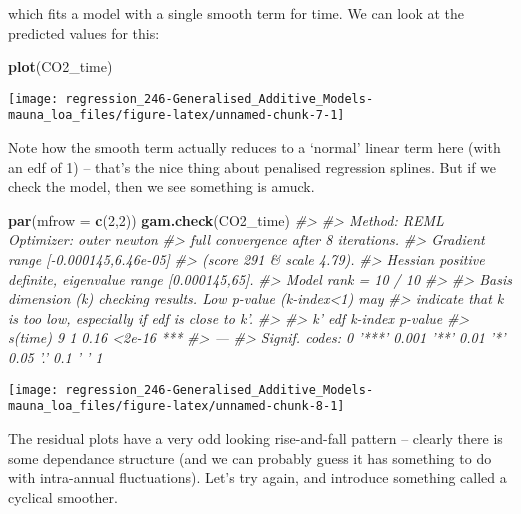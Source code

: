 \documentclass[]{book}
\newenvironment{Shaded}{\begin{snugshade}}{\end{snugshade}}
\newcommand{\CommentTok}[1]{\textcolor[rgb]{0.56,0.35,0.01}{\textit{#1}}}
\newcommand{\DataTypeTok}[1]{\textcolor[rgb]{0.13,0.29,0.53}{#1}}
\newcommand{\DecValTok}[1]{\textcolor[rgb]{0.00,0.00,0.81}{#1}}
\newcommand{\KeywordTok}[1]{\textcolor[rgb]{0.13,0.29,0.53}{\textbf{#1}}}
\newcommand{\NormalTok}[1]{#1}
\begin{document}
which fits a model with a single smooth term for time. We can look at the predicted values for this:

\begin{Shaded}
\begin{Highlighting}[]
\KeywordTok{plot}\NormalTok{(CO2_time)}
\end{Highlighting}
\end{Shaded}

\begin{center}\texttt{[image: regression\_246-Generalised\_Additive\_Models-mauna\_loa\_files/figure-latex/unnamed-chunk-7-1]} \end{center}

Note how the smooth term actually reduces to a `normal' linear term here (with an edf of 1) -- that's the nice thing about penalised regression splines. But if we check the model, then we see something is amuck.

\begin{Shaded}
\begin{Highlighting}[]
\KeywordTok{par}\NormalTok{(}\DataTypeTok{mfrow =} \KeywordTok{c}\NormalTok{(}\DecValTok{2}\NormalTok{,}\DecValTok{2}\NormalTok{))}
\KeywordTok{gam.check}\NormalTok{(CO2_time)}
\CommentTok{#> }
\CommentTok{#> Method: REML   Optimizer: outer newton}
\CommentTok{#> full convergence after 8 iterations.}
\CommentTok{#> Gradient range [-0.000145,6.46e-05]}
\CommentTok{#> (score 291 & scale 4.79).}
\CommentTok{#> Hessian positive definite, eigenvalue range [0.000145,65].}
\CommentTok{#> Model rank =  10 / 10 }
\CommentTok{#> }
\CommentTok{#> Basis dimension (k) checking results. Low p-value (k-index<1) may}
\CommentTok{#> indicate that k is too low, especially if edf is close to k'.}
\CommentTok{#> }
\CommentTok{#>         k' edf k-index p-value    }
\CommentTok{#> s(time)  9   1    0.16  <2e-16 ***}
\CommentTok{#> ---}
\CommentTok{#> Signif. codes:  0 '***' 0.001 '**' 0.01 '*' 0.05 '.' 0.1 ' ' 1}
\end{Highlighting}
\end{Shaded}

\begin{center}\texttt{[image: regression\_246-Generalised\_Additive\_Models-mauna\_loa\_files/figure-latex/unnamed-chunk-8-1]} \end{center}

The residual plots have a very odd looking rise-and-fall pattern -- clearly there is some dependance structure (and we can probably guess it has something to do with intra-annual fluctuations). Let's try again, and introduce something called a cyclical smoother.
\end{document}
